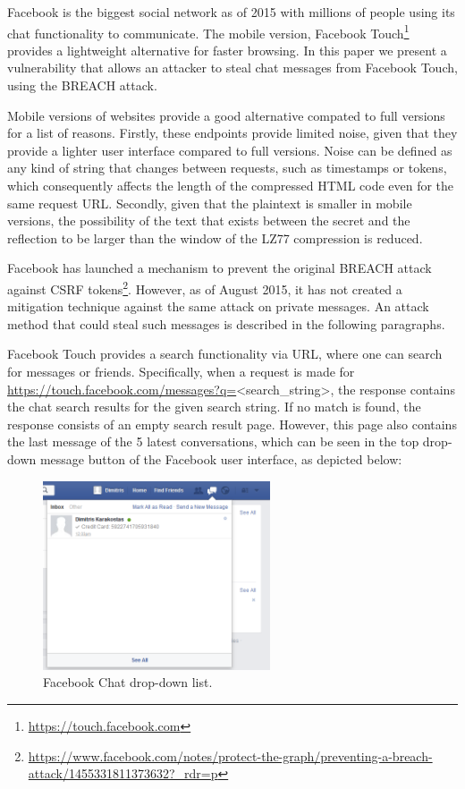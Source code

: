 Facebook is the biggest social network as of 2015 with millions of people using
its chat functionality to communicate. The mobile version, Facebook
Touch\footnote{\url{https://touch.facebook.com}} provides a lightweight
alternative for faster browsing. In this paper we present a vulnerability
that allows an attacker to steal chat messages from Facebook Touch, using the
BREACH attack.

Mobile versions of websites provide a good alternative compated to full versions
for a list of reasons. Firstly, these endpoints provide limited noise, given
that they provide a lighter user interface compared to full versions.  Noise
can be defined as any kind of string that changes between requests, such as
timestamps or tokens, which consequently affects the length of the
compressed HTML code even for the same request URL. Secondly, given that the
plaintext is smaller in mobile versions, the possibility of the text that
exists between the secret and the reflection to be larger than the window of
the LZ77 compression is reduced.

Facebook has launched a mechanism to prevent the original BREACH attack against
CSRF
tokens\footnote{\url{https://www.facebook.com/notes/protect-the-graph/preventing-a-breach-attack/1455331811373632?_rdr=p}}.
However, as of August 2015, it has not created a mitigation technique against
the same attack on private messages. An attack method that could steal such
messages is described in the following paragraphs.

Facebook Touch provides a search functionality via URL, where one can search for
messages or friends. Specifically, when a request is made for
\url{https://touch.facebook.com/messages?q=}<search\_string>, the response
contains the chat search results for the given search string. If no match is
found, the response consists of an empty search result page. However, this page
also contains the last message of the 5 latest conversations, which can be seen
in the top drop-down message button of the Facebook user interface, as depicted
below:

\begin{figure}[h] \caption{Facebook Chat drop-down list.} \centering
\includegraphics[width=0.6\textwidth]{diagrams/fb_message.png}\end{figure}

